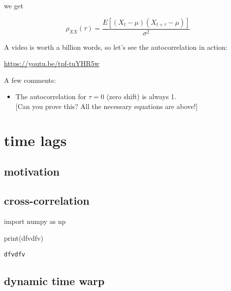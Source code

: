 \documentclass[
  letterpaper,
  DIV=11,
  numbers=noendperiod,
  oneside]{scrreprt}
\newenvironment{Shaded}{\begin{snugshade}}{\end{snugshade}}
\newcommand{\BuiltInTok}[1]{\textcolor[rgb]{0.00,0.23,0.31}{#1}}
\newcommand{\ImportTok}[1]{\textcolor[rgb]{0.00,0.46,0.62}{#1}}
\newcommand{\NormalTok}[1]{\textcolor[rgb]{0.00,0.23,0.31}{#1}}
\newcommand{\StringTok}[1]{\textcolor[rgb]{0.13,0.47,0.30}{#1}}
\providecommand{\tightlist}{%
  \setlength{\itemsep}{0pt}\setlength{\parskip}{0pt}}\usepackage{longtable,booktabs,array}
\begin{document}
we get

\[
\rho_{XX}(\tau) = \frac{E\left[ (X_t - \mu)(X_{t+\tau} - \mu) \right]}{\sigma^2}
\]

A video is worth a billion words, so let's see the autocorrelation in
action:

\url{https://youtu.be/tpf-tuYHR5w}

A few comments:

\begin{itemize}
\tightlist
\item
  The autocorrelation for \(\tau=0\) (zero shift) is always 1.\\
  {[}Can you prove this? All the necessary equations are above!{]}
\end{itemize}

\part{time lags}

\hypertarget{motivation-5}{%
\chapter{motivation}\label{motivation-5}}

\hypertarget{cross-correlation}{%
\chapter{cross-correlation}\label{cross-correlation}}

\begin{Shaded}
\begin{Highlighting}[]
\ImportTok{import}\NormalTok{ numpy }\ImportTok{as}\NormalTok{ np}
\end{Highlighting}
\end{Shaded}

\begin{Shaded}
\begin{Highlighting}[]
\BuiltInTok{print}\NormalTok{(}\StringTok{\textquotesingle{}dfvdfv\textquotesingle{}}\NormalTok{)}
\end{Highlighting}
\end{Shaded}

\begin{verbatim}
dfvdfv
\end{verbatim}

\hypertarget{dynamic-time-warp}{%
\chapter{dynamic time warp}\label{dynamic-time-warp}}
\end{document}
